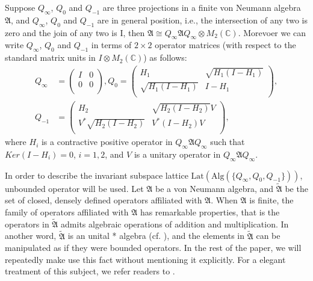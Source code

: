 \documentclass{amsart}
\newcommand{\AAA}{\mathfrak A}
\newcommand{\Lat}{\mathrm{Lat}}
\newcommand{\Alg}{\mathrm{Alg}}
\newcommand{\C}{\mathbb C} %
\begin{document}
 Suppose $Q_{\infty}$, $Q_{0}$ and $Q_{-1}$ are three projections in a finite von Neumann algebra $\AAA$, and $Q_{\infty}$, $Q_{0}$ and $Q_{-1}$ are 
in general position, i.e., the intersection of any two is zero and the join of any two is I, then $\AAA \cong Q_{\infty}\AAA Q_{\infty} \otimes M_{2}(\C)$\cite[Proposition 2.4]{Hou}.
Morevoer we can write $Q_{\infty}$, $Q_{0}$ and $Q_{-1}$ in terms of $2 \times 2$ operator matrices (with respect to the standard matrix units in $I \otimes M_{2}(\C)$)  as follows:
\begin{equation}\label{eq0}
\begin{split}
Q_{\infty}&= \left(
        \begin{array}{cc}
          I & 0 \\
          0 & 0 \\
        \end{array}
      \right),
Q_{0} = \left(
          \begin{array}{cc}
            H_{1} & \sqrt{H_{1}(I-H_{1})} \\
            \sqrt{H_{1}(I-H_{1})} & I-H_{1} \\
          \end{array}
        \right) , \\
Q_{-1}&= \left(
          \begin{array}{cc}
            H_{2} & \sqrt{H_{2}(I-H_{2})}V \\
            V^{*}\sqrt{H_{2}(I-H_{2})} & V^{*}(I-H_{2})V \\
          \end{array}
        \right),
\end{split}
\end{equation}
where $H_i$ is a contractive positive operator in $Q_{\infty}\AAA Q_{\infty}$ such that $Ker(I - H_i) = 0$, $i = 1, 2$,
and $V$ is a unitary operator in $Q_{\infty}\AAA Q_{\infty}$. 

In order to describe the invariant subspace lattice $\Lat(\Alg(\{Q_{\infty}, Q_{0}, Q_{-1}\}))$, 
unbounded operator will be used. Let $\AAA$ be a von Neumann algebra, and
$\widetilde{\AAA}$ be the set of closed, densely defined operators affiliated with $\AAA$.
When $\AAA$ is finite, the family of operators affiliated with $\AAA$ has remarkable properties, 
that is the operators in $\widetilde{\AAA}$ admits algebraic operations of addition and multiplication.
In another word,  $\widetilde{\AAA}$ is an unital * algebra (cf. \cite{MV2}), and the elements in $\widetilde{\AAA} $ can be manipulated as if they were bounded operators.
In the rest of the paper, we will repeatedly make use this fact without mentioning it explicitly. 
For a elegant treatment of this subject, we refer readers to \cite{Zhe}. 
\end{document}
